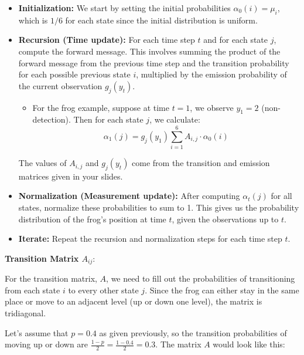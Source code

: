\documentclass[10pt]{article}
\begin{document}
\begin{itemize}
  \item \textbf{Initialization:} We start by setting the initial probabilities \( \alpha_0(i) = \mu_i \), which is \( 1/6 \) for each state since the initial distribution is uniform.

  \item \textbf{Recursion (Time update):} For each time step \( t \) and for each state \( j \), compute the forward message. This involves summing the product of the forward message from the previous time step and the transition probability for each possible previous state \( i \), multiplied by the emission probability of the current observation \( g_j(y_t) \).

  \begin{itemize}
    \item For the frog example, suppose at time \( t=1 \), we observe \( y_1 = 2 \) (non-detection). Then for each state \( j \), we calculate:
\[ \alpha_1(j) = g_j(y_1) \sum_{i=1}^{6} A_{i,j} \cdot \alpha_{0}(i) \]

  \end{itemize}The values of \( A_{i,j} \) and \( g_j(y_t) \) come from the transition and emission matrices given in your slides.

  \item \textbf{Normalization (Measurement update):} After computing \( \alpha_t(j) \) for all states, normalize these probabilities to sum to 1. This gives us the probability distribution of the frog's position at time \( t \), given the observations up to \( t \).

  \item \textbf{Iterate:} Repeat the recursion and normalization steps for each time step \( t \).

\end{itemize}

\textbf{Transition Matrix \( A_{ij} \)}:

For the transition matrix, \( A \), we need to fill out the probabilities of transitioning from each state \( i \) to every other state \( j \). Since the frog can either stay in the same place or move to an adjacent level (up or down one level), the matrix is tridiagonal.

Let's assume that \( p = 0.4 \) as given previously, so the transition probabilities of moving up or down are \( \frac{1-p}{2} = \frac{1-0.4}{2} = 0.3 \). The matrix \( A \) would look like this:
\end{document}
